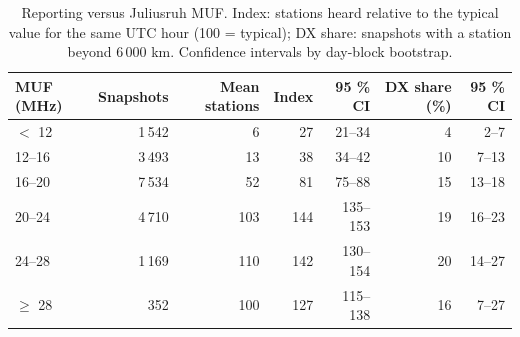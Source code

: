 \begin{table}[htbp]\centering\small
\caption{Reporting versus Juliusruh MUF. Index: stations heard relative to the typical value for the same UTC hour (100 = typical); DX share: snapshots with a station beyond 6\,000 km. Confidence intervals by day-block bootstrap.}\label{tab:muf}
\begin{tabular}{lrrrrrr}
\toprule
MUF (MHz) & Snapshots & Mean stations & Index & 95 \% CI & DX share (\%) & 95 \% CI \\
\midrule
$<$ 12 & 1\,542 & 6 & 27 & 21--34 & 4 & 2--7 \\
12--16 & 3\,493 & 13 & 38 & 34--42 & 10 & 7--13 \\
16--20 & 7\,534 & 52 & 81 & 75--88 & 15 & 13--18 \\
20--24 & 4\,710 & 103 & 144 & 135--153 & 19 & 16--23 \\
24--28 & 1\,169 & 110 & 142 & 130--154 & 20 & 14--27 \\
$\geq$ 28 & 352 & 100 & 127 & 115--138 & 16 & 7--27 \\
\bottomrule
\end{tabular}
\end{table}

